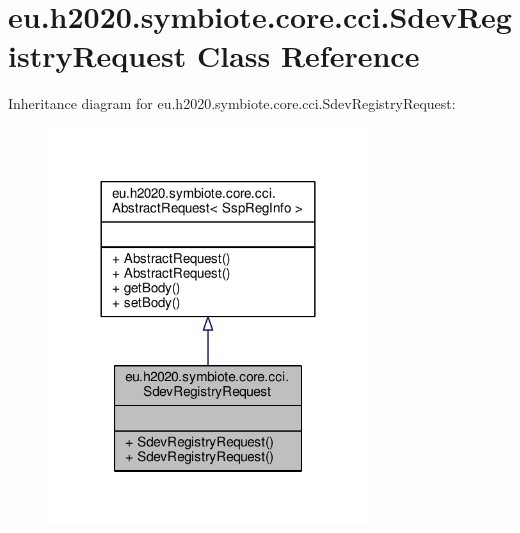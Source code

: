 \hypertarget{classeu_1_1h2020_1_1symbiote_1_1core_1_1cci_1_1SdevRegistryRequest}{}\section{eu.\+h2020.\+symbiote.\+core.\+cci.\+Sdev\+Registry\+Request Class Reference}
\label{classeu_1_1h2020_1_1symbiote_1_1core_1_1cci_1_1SdevRegistryRequest}


Inheritance diagram for eu.\+h2020.\+symbiote.\+core.\+cci.\+Sdev\+Registry\+Request\+:
\nopagebreak
\begin{figure}[H]
\begin{center}
\leavevmode
\includegraphics[width=240pt]{classeu_1_1h2020_1_1symbiote_1_1core_1_1cci_1_1SdevRegistryRequest__inherit__graph}
\end{center}
\end{figure}



